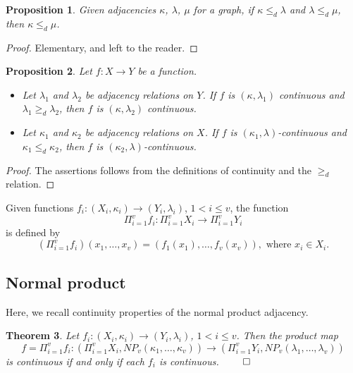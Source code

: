\documentclass{article}
\theoremstyle{plain}
\newtheorem{thm}{Theorem}
\newtheorem{prop}[thm]{Proposition}
\theoremstyle{definition}
\numberwithin{thm}{section}
\begin{document}
\begin{prop} Given adjacencies
$\kappa$, $\lambda$, $\mu$ for a graph, if $\kappa \le_d \lambda$ 
and $\lambda \le_d \mu$, then
$\kappa \le_d \mu$.
\end{prop}

\begin{proof}
Elementary, and left to the reader.
\end{proof}

\begin{prop}
Let $f: X \to Y$ be a function.
\begin{itemize}
\item Let $\lambda_1$ and $\lambda_2$ be adjacency relations on $Y$. If $f$ is $(\kappa, \lambda_1)$ continuous and $\lambda_1 \ge_d \lambda_2$, then $f$ is
$(\kappa, \lambda_2)$ continuous.
\item Let $\kappa_1$ and $\kappa_2$ be adjacency relations on $X$. If $f$ is $(\kappa_1, \lambda)$-continuous and $\kappa_1 \le_d \kappa_2$, then $f$ is
$(\kappa_2, \lambda)$-continuous.
\end{itemize}
\end{prop}

\begin{proof} The assertions follows from the definitions of continuity and the $\ge_d$ relation.
\end{proof}

Given functions $f_i: (X_i, \kappa_i) \to (Y_i, \lambda_i)$,
$1 < i \leq v$, the function
\[ \Pi_{i=1}^v f_i: \Pi_{i=1}^v X_i \to \Pi_{i=1}^v Y_i\]
is defined by
\[ (\Pi_{i=1}^v f_i)(x_1, \ldots, x_v) = (f_1(x_1), \ldots, f_v(x_v)), \mbox{ where } x_i \in X_i. \]

\subsection{Normal product}
Here, we recall continuity properties of the normal product adjacency.

\begin{thm}
\label{prod-cont}
{\rm \cite{Boxer16a}}
Let $f_i: (X_i, \kappa_i) \to (Y_i, \lambda_i)$, $1 < i \leq v$.
Then the product map
\[ f=\Pi_{i=1}^v f_i: (\Pi_{i=1}^v X_i, NP_v(\kappa_1, \ldots, \kappa_v)) \to (\Pi_{i=1}^v Y_i, NP_v(\lambda_1, \ldots, \lambda_v)) \]
is continuous if and only if each $f_i$ is continuous. $\qed$
\end{thm}
\end{document}

